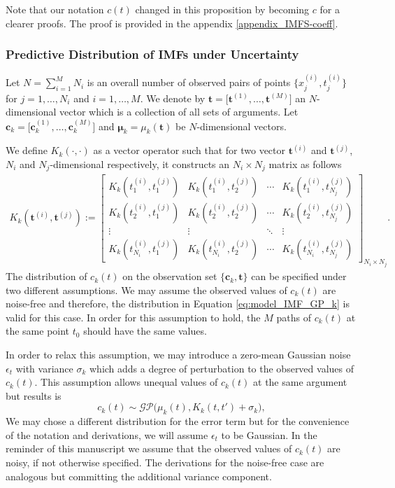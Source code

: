 Note that our notation $c(t)$ changed in this proposition by becoming $c$ for a clearer proofs. The proof is provided in the appendix \ref{appendix_IMFS-coeff}.


\subsubsection{Predictive Distribution of IMFs  under Uncertainty}
Let $N = \sum_{i=1}^M N_i$ is an overall number of  observed pairs of points $\big\{x_j^{(i)}, t^{(i)}_j \big\}$  for $j = 1,\dots,N_i$ and $i = 1,\ldots	, M$. We denote by $\mathbf{t} = \big[ \mathbf{t}^{(1)} ,\ldots,\mathbf{t}^{(M)} \big]$ an $N$-dimensional vector which is a collection of all sets of arguments. Let $\mathbf{c}_k  = \big[ \mathbf{c}_k^{(1)} ,\ldots,\mathbf{c}_k^{(M)} \big]$ and $\bm{\mu}_k = \mu_k(\mathbf{t})$  be  $N$-dimensional vectors. 

We define $K_k( \cdot, \cdot)$ as a vector operator such that for two vector $\mathbf{t}^{(i)}$ and $\mathbf{t}^{(j)}$,  $N_i$ and $N_j$-dimensional respectively, it constructs an $N_i\times N_j$ matrix as follows
\begin{align*}
K_k (\mathbf{t}^{(i)},\mathbf{t}^{(j)}  ) := \begin{bmatrix}
K_k(t_1^{(i)},t_1^{(j)}) & K_k(t_1^{(i)},t_2^{(j)})& \cdots & K_k(t_1^{(i)},t_{N_j}^{(j)}) \\
K_k(t_2^{(i)},t_1^{(j)}) & K_k(t_2^{(i)},t_2^{(j)})& \cdots & K_k(t_2^{(i)},t_{N_j}^{(j)}) \\
\vdots & \vdots & \ddots & \vdots  \\
K_k(t_{N_i}^{(i)},t_1^{(j)}) & K_k(t_{N_i}^{(i)},t_2^{(j)})& \cdots & K_k(t_{N_i}^{(i)},t_{N_j}^{(j)}) 
\end{bmatrix}_{ N_i \times	N_j}. 
\end{align*}
The distribution of $c_k(t)$ on the observation set $\big\{ \mathbf{c}_k, \mathbf{t} \big\}$ can be specified under two different assumptions.  We may assume  the observed values of $c_k(t)$ are noise-free and therefore, the distribution in Equation \eqref{eq:model_IMF_GP_k} is valid for this case. In order for this assumption to hold, the $M$ paths of $c_k(t)$ at the same point $t_0$ should have the same values. 

In order to relax this assumption, we may introduce a zero-mean Gaussian noise $\epsilon_t$ with variance $\sigma_k$ which adds  a degree of perturbation to the observed values of $c_k(t)$. This assumption allows unequal values of $c_k(t)$ at the same argument but results is  
\begin{equation}\label{eq:model_IMF_GP_k_noisy}
c_k(t) \sim \mathcal{GP} \Big( \mu_k(t), K_k(t,t')+ \sigma_k\Big), 
\end{equation}
We may chose a different distribution for the error term but for the convenience of the notation and derivations, we will assume $\epsilon_t$ to be Gaussian.  In the reminder of this manuscript we assume that the observed values of $c_k(t)$ are noisy, if not otherwise specified. The derivations for the noise-free case are analogous but committing the additional variance component.


